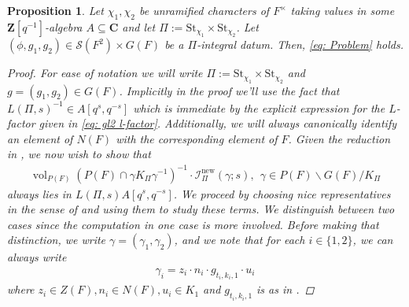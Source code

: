 \documentclass{amsart}
\theoremstyle{plain}
\newtheorem{prop}[thm]{Proposition}
\theoremstyle{plain}
\theoremstyle{remark}
\DeclareMathOperator{\vol}{vol}
\begin{document}
\begin{prop}\label{thm steinberg}
    Let $\chi_1,\chi_2$ be unramified characters of $F^\times$ taking values in some $\mathbf{Z}[q^{-1}]$-algebra $A\subseteq\mathbf{C}$ and let $\Pi:=\mathrm{St}_{\chi_1}\times \mathrm{St}_{\chi_2}$. Let $(\phi,g_1,g_2)\in\mathcal{S}(F^2)\times G(F)$ be a $\Pi$-integral datum. Then, \eqref{eq: Problem} holds.
    \begin{proof}
        For ease of notation we will write $\Pi:=\mathrm{St}_{\chi_1}\times \mathrm{St}_{\chi_2}$ and $g=(g_1,g_2)\in G(F)$. Implicitly in the proof we'll use the fact that $L(\Pi,s)^{-1}\in A[q^s,q^{-s}]$ which is immediate by the explicit expression for the $L$-factor given in \eqref{eq: gl2 l-factor}. Additionally, we will always canonically identify an element of $N(F)$ with the corresponding element of $F$. Given the reduction in , we now wish to show that
        \begin{align}
            \vol_{P(F)}(P(F)\cap \gamma K_\Pi \gamma^{-1})^{-1}\cdot \mathcal{I}_{\Pi}^\mathrm{new}(\gamma ;s),\ \ \gamma\in P(F)\backslash G(F)/K_\Pi
        \end{align}
        always lies in $L(\Pi,s)A[q^s,q^{-s}]$.
        We proceed by choosing nice representatives in the sense of  and using them to study these terms. We distinguish between two cases since the computation in one case is more involved. Before making that distinction, we write $\gamma=(\gamma_1,\gamma_2)$, and we note that for each $i\in\{1,2\}$, we can always write 
        \begin{align}\label{eq: gamma_i}\gamma_i=z_i\cdot n_i\cdot g_{t_i,k_i,1}\cdot u_i\end{align}
        where $z_i\in Z(F),n_i\in N(F), u_i\in K_1$ and $g_{t_i,k_i,1}$ is as in . 


\end{proof}
\end{prop}
\end{document}
